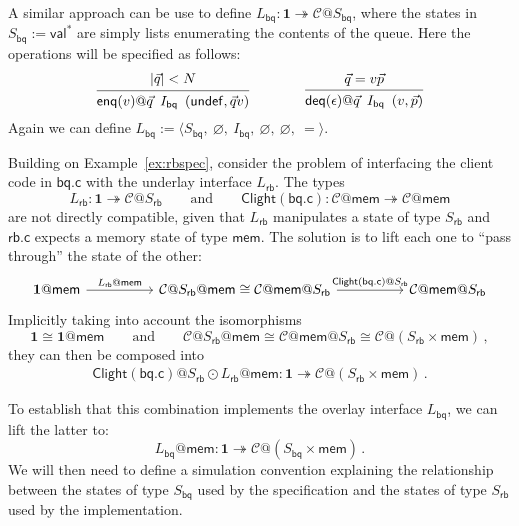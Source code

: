 \documentclass[acmsmall,screen,review,anonymous]{acmart}
\newcommand{\kw}[1]{\ensuremath{ \mathsf{#1} }}
\newcommand{\Clight}{\ensuremath{ \mathsf{Clight} }}
\begin{document}
\begin{example}
A similar approach can be use to define
$L_\kw{bq} : \mathbf{1} \twoheadrightarrow \mathcal{C}@S_\kw{bq}$,
where the states in $S_\kw{bq} := \kw{val}^*$
are simply lists enumerating the contents of the queue.
Here the operations will be specified as follows:
\[
  \begin{prooftree}
    \hypo{|\vec{q}| < N}
    \infer1{\kw{enq}(v)@\vec{q} \:\mathrel{I_\kw{bq}}\: (\kw{undef}, \vec{q}v)}
  \end{prooftree}
  \qquad\qquad
  \begin{prooftree}
    \hypo{\vec{q} = v\vec{p}}
    \infer1{\kw{deq}(\epsilon)@\vec{q} \:\mathrel{I_\kw{bq}}\: (v, \vec{p})}
  \end{prooftree}
\]
Again we can define $L_\kw{bq} := \langle
  S_\kw{bq},\:
  \varnothing,\:
  I_\kw{bq},\:
  \varnothing,\:
  \varnothing,\:
  {=}
\rangle$.
\end{example}

\begin{example}[Interfacing $L_\kw{rb}$ with client code] \label{ex:context} %
Building on Example~\ref{ex:rbspec},
consider the problem of interfacing
the client code in $\kw{bq.c}$ with the underlay interface $L_\kw{rb}$.
The types
\[
  L_\kw{rb} : \mathbf{1} \twoheadrightarrow \mathcal{C}@S_\kw{rb}
  \qquad
  \text{and}
  \qquad
  \Clight(\kw{bq.c}) : \mathcal{C}@\kw{mem} \twoheadrightarrow \mathcal{C}@\kw{mem}
\]
are not directly compatible,
given that $L_\kw{rb}$ manipulates a state of type $S_\kw{rb}$
and $\kw{rb.c}$ expects a memory state of type $\kw{mem}$.
The solution is to lift each one to ``pass through''
the state of the other:
\[
  \begin{tikzcd}[column sep=huge]
    \mathbf{1}@\kw{mem}
    \ar[r, "L_\kw{rb}@\kw{mem}"] &
    \mathcal{C}@S_\kw{rb}@\kw{mem} \cong
    \mathcal{C}@\kw{mem}@S_\kw{rb}
    \ar[r, "\Clight(\kw{bq.c})@S_\kw{rb}"] &
    \mathcal{C}@\kw{mem}@S_\kw{rb}
  \end{tikzcd}
\]
Implicitly taking into account the isomorphisms
\[
  \mathbf{1} \cong \mathbf{1}@\kw{mem}
  \qquad
  \text{and}
  \qquad
  \mathcal{C}@S_\kw{rb}@\kw{mem} \cong
  \mathcal{C}@\kw{mem}@S_\kw{rb} \cong
  \mathcal{C}@(S_\kw{rb} \times \kw{mem})
  \,,
\]
they can then be composed into
\begin{gather*}
  \Clight(\kw{bq.c})@S_\kw{rb} \odot
  L_\kw{rb}@\kw{mem} :
  \mathbf{1} \twoheadrightarrow \mathcal{C}@(S_\kw{rb} \times \kw{mem})
  \,.
\end{gather*}

To establish that this combination implements the overlay interface $L_\kw{bq}$,
we can lift the latter to:
\[
  L_\kw{bq}@\kw{mem} : \mathbf{1} \twoheadrightarrow
    \mathcal{C}@(S_\kw{bq} \times \kw{mem})
  \,.
\]
We will then need to define a simulation convention
explaining the relationship between
the states of type $S_\kw{bq}$ used by the specification and
the states of type $S_\kw{rb}$ used by the implementation.
\end{example}
\end{document}
